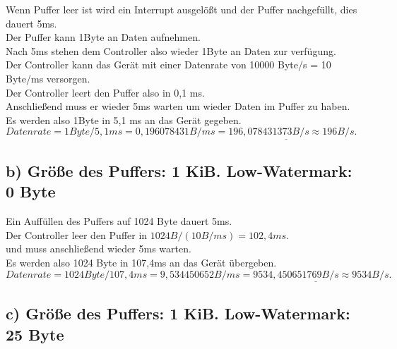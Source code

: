 \documentclass{ti2}
\begin{document}
Wenn Puffer leer ist wird ein Interrupt ausgelößt und der Puffer nachgefüllt, dies dauert 5ms.\\
Der Puffer kann 1Byte an Daten aufnehmen.\\
Nach 5ms stehen dem Controller also wieder 1Byte an Daten zur verfügung.\\
Der Controller kann das Gerät mit einer Datenrate von 10000 Byte/s = 10 Byte/ms versorgen.\\
Der Controller leert den Puffer also in 0,1 ms.\\
Anschließend muss er wieder 5ms warten um wieder Daten im Puffer zu haben.\\
Es werden also 1Byte in 5,1 ms an das Gerät gegeben.\\
\begin{math}
	Datenrate = {1 Byte}/{5,1 ms} = 0,196078431 B/ms \underline{= 196,078431373 B/s \approx 196 B/s.}
\end{math}

 

\subsection*{b)  Größe des Puffers: 1 KiB. Low-Watermark: 0 Byte}

Ein Auffüllen des Puffers auf 1024 Byte dauert 5ms.\\
Der Controller leer den Puffer in $1024B / (10B/ms) = 102,4ms$.\\
und muss anschließend wieder 5ms warten.\\
Es werden also 1024 Byte in 107,4ms an das Gerät übergeben.\\
\begin{math}
Datenrate = {1024 Byte}/{107,4ms} = 9,534450652 B/ms \underline{= 9534,450651769 B/s \approx 9534 B/s.}
\end{math}


\subsection*{c)  Größe des Puffers: 1 KiB. Low-Watermark: 25 Byte}
\end{document}
